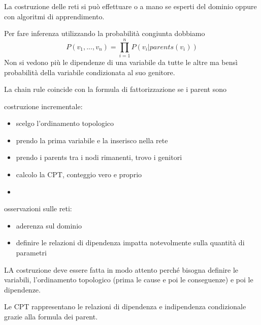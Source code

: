 La costruzione delle reti si può effettuare o a mano se esperti del dominio oppure
con algoritmi di apprendimento.

Per fare inferenza utilizzando la probabilità congiunta dobbiamo 
$$P(v_1,...,v_n) = \prod_{i=1}^{n} P(v_i|parents(v_i))$$
Non si vedono più le dipendenze di una variabile da tutte le altre ma bensì probabilità della variabile 
condizionata al suo genitore.

La chain rule coincide con la formula di fattorizzazione se i parent sono 

costruzione incrementale:
\begin{itemize}
    \item scelgo l'ordinamento topologico
    \item prendo la prima variabile e la inserisco nella rete
    \item prendo i parents tra i nodi rimanenti, trovo i genitori
    \item calcolo la CPT, conteggio vero e proprio
    \item 
\end{itemize}

osservazioni sulle reti:
\begin{itemize}
    \item aderenza sul dominio
    \item definire le relazioni di dipendenza impatta notevolmente sulla quantità
    di parametri
\end{itemize}

LA costruzione deve essere fatta in modo attento perché bisogna definire le variabili,
l'ordinamento topologico (prima le cause e poi le conseguenze) e poi le dipendenze.

Le CPT rappresentano le relazioni di dipendenza e indipendenza condizionale
grazie alla formula dei parent.